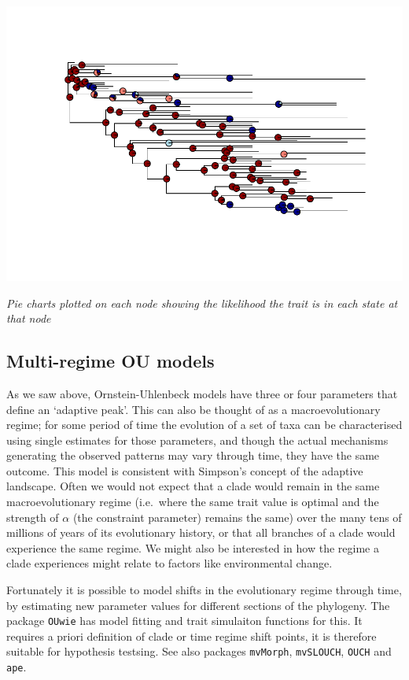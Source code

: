 \documentclass[]{article}
\begin{document}
\includegraphics{module_08_files/figure-latex/unnamed-chunk-29-1.pdf}

\emph{Pie charts plotted on each node showing the likelihood the trait
is in each state at that node}

\subsection{Multi-regime OU models}\label{multi-regime-ou-models}

As we saw above, Ornstein-Uhlenbeck models have three or four parameters
that define an `adaptive peak'. This can also be thought of as a
macroevolutionary regime; for some period of time the evolution of a set
of taxa can be characterised using single estimates for those
parameters, and though the actual mechanisms generating the observed
patterns may vary through time, they have the same outcome. This model
is consistent with Simpson's concept of the adaptive landscape. Often we
would not expect that a clade would remain in the same macroevolutionary
regime (i.e.~where the same trait value is optimal and the strength of
\(\alpha\) (the constraint parameter) remains the same) over the many
tens of millions of years of its evolutionary history, or that all
branches of a clade would experience the same regime. We might also be
interested in how the regime a clade experiences might relate to factors
like environmental change.

Fortunately it is possible to model shifts in the evolutionary regime
through time, by estimating new parameter values for different sections
of the phylogeny. The package \texttt{OUwie} has model fitting and trait
simulaiton functions for this. It requires a priori definition of clade
or time regime shift points, it is therefore suitable for hypothesis
testsing. See also packages \texttt{mvMorph}, \texttt{mvSLOUCH},
\texttt{OUCH} and \texttt{ape}.
\end{document}
